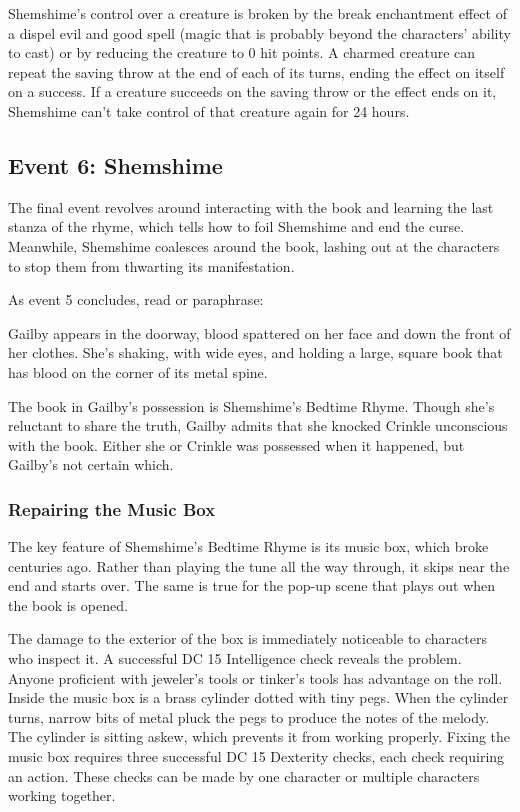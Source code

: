 \documentclass[10pt,a4paper,twoside,bg=print,twocolumn,openany,nodeprecatedcode]{dndbook}
\begin{document}
Shemshime's control over a creature is broken by the break enchantment effect of a dispel evil and good spell (magic that is probably beyond the characters' ability to cast) or by reducing the creature to 0 hit points. A charmed creature can repeat the saving throw at the end of each of its turns, ending the effect on itself on a success. If a creature succeeds on the saving throw or the effect ends on it, Shemshime can't take control of that creature again for 24 hours.

\subsection{Event 6: Shemshime}
The final event revolves around interacting with the book and learning the last stanza of the rhyme, which tells how to foil Shemshime and end the curse. Meanwhile, Shemshime coalesces around the book, lashing out at the characters to stop them from thwarting its manifestation.

As event 5 concludes, read or paraphrase:

\begin{DndReadAloud}{}
Gailby appears in the doorway, blood spattered on her face and down the front of her clothes. She's shaking, with wide eyes, and holding a large, square book that has blood on the corner of its metal spine.

\end{DndReadAloud}

The book in Gailby's possession is Shemshime's Bedtime Rhyme. Though she's reluctant to share the truth, Gailby admits that she knocked Crinkle unconscious with the book. Either she or Crinkle was possessed when it happened, but Gailby's not certain which.

\subsubsection{Repairing the Music Box}
The key feature of Shemshime's Bedtime Rhyme is its music box, which broke centuries ago. Rather than playing the tune all the way through, it skips near the end and starts over. The same is true for the pop-up scene that plays out when the book is opened.

The damage to the exterior of the box is immediately noticeable to characters who inspect it. A successful DC 15 Intelligence check reveals the problem. Anyone proficient with jeweler's tools or tinker's tools has advantage on the roll. Inside the music box is a brass cylinder dotted with tiny pegs. When the cylinder turns, narrow bits of metal pluck the pegs to produce the notes of the melody. The cylinder is sitting askew, which prevents it from working properly. Fixing the music box requires three successful DC 15 Dexterity checks, each check requiring an action. These checks can be made by one character or multiple characters working together.
\end{document}
